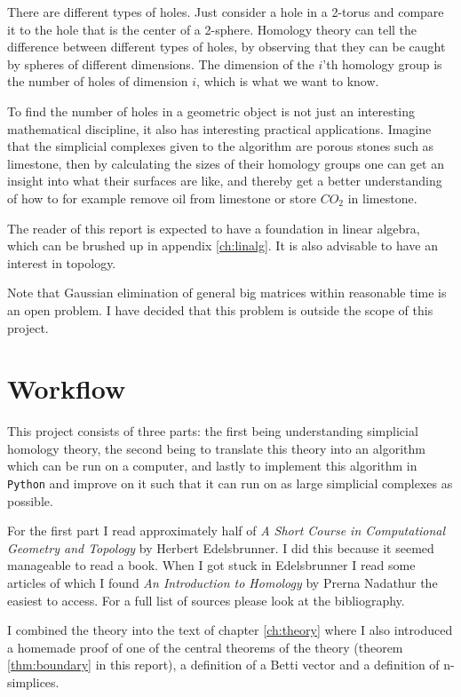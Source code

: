 \documentclass[11pt,a4paper,twoside]{report}
\begin{document}
There are different types of holes. Just consider a hole in a 2-torus and compare it to the hole that is the center of a 2-sphere. Homology theory can tell the difference between different types of holes, by observing that they can be caught by spheres of different dimensions. The dimension of the $i$'th homology group is the number of holes of dimension $i$, which is what we want to know.

To find the number of holes in a geometric object is not just an interesting mathematical discipline, it also has interesting practical applications. Imagine that the simplicial complexes given to the algorithm are porous stones such as limestone, then by calculating the sizes of their homology groups one can get an insight into what their surfaces are like, and thereby get a better understanding of how to for example remove oil from limestone or store $CO_2$ in limestone. 

The reader of this report is expected to have a foundation in linear algebra, which can be brushed up in appendix \ref{ch:linalg}. It is also advisable to have an interest in topology.

Note that Gaussian elimination of general big matrices within reasonable time is an open problem. I have decided that this problem is outside the scope of this project.
\newpage
\section*{Workflow}
This project consists of three parts: the first being understanding simplicial homology theory, the second being to translate this theory into an algorithm which can be run on a computer, and lastly to implement this algorithm in \texttt{Python} and improve on it such that it can run on as large simplicial complexes as possible.

For the first part I read approximately half of \emph{A Short Course in Computational Geometry and Topology} by Herbert Edelsbrunner\cite{Edelsbrunner}. I did this because it seemed manageable to read a book. When I got stuck in Edelsbrunner I read some articles of which I found \emph{An Introduction to Homology} by Prerna Nadathur \cite{Nadathur} the easiest to access. For a full list of sources please look at the bibliography.

I combined the theory into the text of chapter \ref{ch:theory} where I also introduced a homemade proof of one of the central theorems of the theory (theorem \ref{thm:boundary} in this report), a definition of a Betti vector and a definition of n-simplices.
\end{document}
